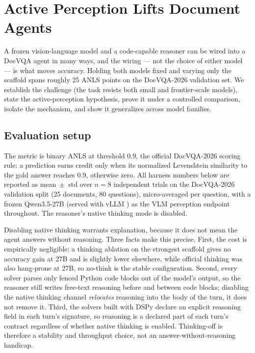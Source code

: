 \section{Active Perception Lifts Document Agents}
\label{sec:harness}

A frozen vision-language model and a code-capable reasoner can be wired into a DocVQA agent in many ways, and the wiring --- not the choice of either model --- is what moves accuracy. Holding both models fixed and varying only the scaffold spans roughly 25 ANLS points on the DocVQA-2026 validation set. We establish the challenge (the task resists both small and frontier-scale models), state the active-perception hypothesis, prove it under a controlled comparison, isolate the mechanism, and show it generalizes across model families.

\subsection{Evaluation setup}
\label{sec:setup}

The metric is binary ANLS at threshold 0.9, the official DocVQA-2026 scoring rule: a prediction earns credit only when its normalized Levenshtein similarity to the gold answer reaches 0.9, otherwise zero. All harness numbers below are reported as mean~$\pm$~std over $n{=}8$ independent trials on the DocVQA-2026 validation split (25 documents, 80 questions), micro-averaged per question, with a frozen Qwen3.5-27B (served with vLLM \citep{vllm}) as the VLM perception endpoint throughout. The reasoner's native thinking mode is disabled.

Disabling native thinking warrants explanation, because it does not mean the agent answers without reasoning. Three facts make this precise. First, the cost is empirically negligible: a thinking ablation on the strongest scaffold gives no accuracy gain at 27B and is slightly lower elsewhere, while official thinking was also hang-prone at 27B, so no-think is the stable configuration. Second, every solver parses only fenced Python code blocks out of the model's output, so the reasoner still writes free-text reasoning before and between code blocks; disabling the native thinking channel \emph{relocates} reasoning into the body of the turn, it does not remove it. Third, the solvers built with DSPy \citep{dspy} declare an explicit reasoning field in each turn's signature, so reasoning is a declared part of each turn's contract regardless of whether native thinking is enabled. Thinking-off is therefore a stability and throughput choice, not an answer-without-reasoning handicap.

